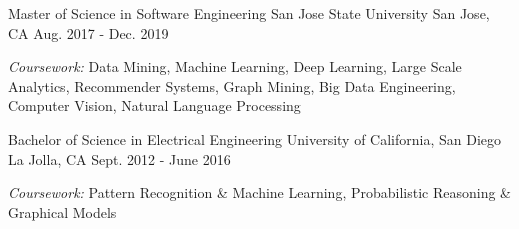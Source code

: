 

\begin{cventries}

  \cventry
    {Master of Science in Software Engineering} %
    {San Jose State University} %
    {San Jose, CA} %
    {Aug. 2017 - Dec. 2019} %
    {
      \begin{cvitems} %
        \item {\textit{Coursework:} Data Mining, Machine Learning, Deep Learning, Large Scale Analytics, Recommender Systems, Graph Mining, Big Data Engineering, Computer Vision, Natural Language Processing}
      \end{cvitems}
    }
   
  \cventry
    {Bachelor of Science in Electrical Engineering} %
    {University of California, San Diego} %
    {La Jolla, CA} %
    {Sept. 2012 - June 2016} %
    {
      \begin{cvitems} %
        \item {\textit{Coursework:} Pattern Recognition \& Machine Learning, Probabilistic Reasoning \& Graphical Models}
      \end{cvitems}
    }

\end{cventries}
